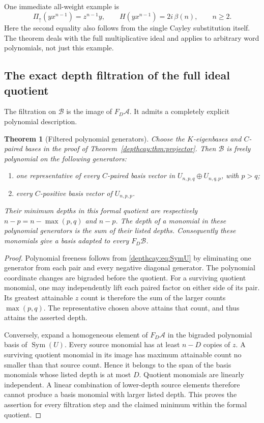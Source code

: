 \documentclass[11pt,a4paper]{article}
\numberwithin{equation}{section}
\newtheorem{theorem}{Theorem}[section]
\theoremstyle{definition}
\theoremstyle{remark}
\begin{document}
One immediate all-weight example is
\[
 \Pi_{\uparrow}(yx^{n-1})=z^{n-1}y,\qquad
 H(yx^{n-1})=2i\,\beta(n),\qquad n\ge2.
\]
Here the second equality also follows from the single Cayley substitution
itself. The theorem deals with the full multiplicative ideal and applies
to arbitrary word polynomials, not just this example.

\subsection{The exact depth filtration of the full ideal quotient}

The filtration on $\mathcal B$ is the image of $F_D\mathcal A$.
It admits a completely explicit polynomial description.

\begin{theorem}[Filtered polynomial generators]\label{depthcay:thm:filtered}
Choose the $K$-eigenbases and $C$-paired bases in the proof of
Theorem~\ref{depthcay:thm:projector}. Then $\mathcal B$ is freely
polynomial on the following generators:
\begin{enumerate}
\item one representative of every $C$-paired basis vector in
$U_{n,p,q}\oplus U_{n,q,p}$, with $p>q$;
\item every $C$-positive basis vector of $U_{n,p,p}$.
\end{enumerate}
Their minimum depths in this formal quotient are respectively
$n-p=n-\max(p,q)$ and $n-p$. The depth of a monomial in these
polynomial generators is the sum of their listed depths. Consequently
these monomials give a basis adapted to every $F_D\mathcal B$.
\end{theorem}

\begin{proof}
Polynomial freeness follows from \eqref{depthcay:eq:SymU} by eliminating
one generator from each pair and every negative diagonal generator.
The polynomial coordinate changes are bigraded before the quotient.
For a surviving quotient monomial, one may independently lift each
paired factor on either side of its pair. Its greatest attainable
$z$ count is therefore the sum of the larger counts $\max(p,q)$.
The representative chosen above attains that count, and thus attains
the asserted depth.

Conversely, expand a homogeneous element of $F_D\mathcal A$ in the
bigraded polynomial basis of $\operatorname{Sym}(U)$. Every source
monomial has at least $n-D$ copies of $z$. A surviving quotient
monomial in its image has maximum attainable count no smaller than
that source count. Hence it belongs to the span of the basis monomials
whose listed depth is at most $D$. Quotient monomials are linearly
independent. A linear combination of lower-depth source elements
therefore cannot produce a basis monomial with larger listed depth.
This proves the assertion for every filtration step and the claimed
minimum within the formal quotient.
\end{proof}
\end{document}
